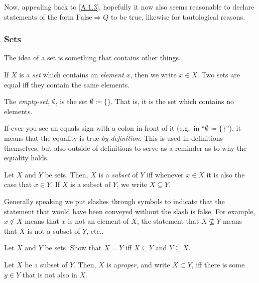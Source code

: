 Now, appealing back to \eqref{A.1.3}, hopefully it now also seems reasonable to declare statements of the form $\text{False}\Rightarrow Q$ to be true, likewise for tautological reasons.

\subsubsection{Sets}

The idea of a set is something that contains other things.
\begin{textequation}
If $X$ is a \emph{set} which contains an \emph{element} $x$, then we write $x\in X$.  Two sets are equal iff they contain the same elements.
\end{textequation}
\begin{dfn}
The \emph{empty-set}, $\emptyset$, is the set $\emptyset \coloneqq \{ \}$.  That is, it is the set which contains no elements.
\end{dfn}
\begin{rmk}
If ever you see an equals sign with a colon in front of it (e.g.~in ``$\emptyset \coloneqq \{ \}$''), it means that the equality is true \emph{by definition}.  This is used in definitions themselves, but also outside of definitions to serve as a reminder as to why the equality holds.\index[notation]{$\coloneqq $}
\end{rmk}
\begin{dfn}[Subset]
Let $X$ and $Y$ be sets.  Then, $X$ is a \emph{subset} of $Y$ iff whenever $x\in X$ it is also the case that $x\in Y$.  If $X$ is a subset of $Y$, we write $X\subseteq Y$.
\end{dfn}
\begin{rmk}
Generally speaking we put slashes through symbols to indicate that the statement that would have been conveyed without the slash is false.  For example, $x\notin X$ means that $x$ is not an element of $X$, the statement that $X\not \subseteq Y$ means that $X$ is not a subset of $Y$, etc..
\end{rmk}
\begin{exr}
Let $X$ and $Y$ be sets.  Show that $X=Y$ iff $X\subseteq Y$ and $Y\subseteq X$.
\end{exr}
\begin{dfn}\label{ProperSubset}
Let $X$ be a subset of $Y$.  Then, $X$ is a\emph{proper}, and write $X\subset Y$, iff there is some $y\in Y$ that is not also in $X$.
\end{dfn}

